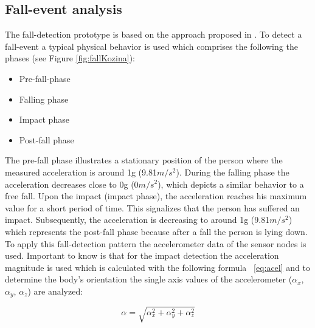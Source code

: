 \documentclass[review]{elsarticle}
\begin{document}
\subsection{Fall-event analysis}
\label{subsec:fall-analysis}
The fall-detection prototype is based on the approach proposed in \cite{Gjoreski2014, Kozina}. To detect a fall-event a typical physical behavior is used which comprises the following the phases (see Figure \ref{fig:fallKozina}):
\begin{itemize}
	\item Pre-fall-phase 
	\item Falling phase
	\item Impact phase
	\item Post-fall phase
\end{itemize}
The pre-fall phase illustrates a stationary position of the person where the measured acceleration is around 1g (9.81$m/s^{2}$). During the falling phase the  acceleration decreases close to 0g (0$m/s^{2}$), which depicts a similar behavior to a free fall. Upon the impact (impact phase), the acceleration reaches his maximum value for a short period of time. This signalizes that the person has suffered an impact. Subsequently, the acceleration is decreasing to around 1g (9.81$m/s^{2}$) which represents the post-fall phase because after a fall the person is lying down. To apply this fall-detection pattern the accelerometer data of the sensor nodes is used. Important to know is that for the impact detection the acceleration magnitude is used which is calculated with the following formula ~\ref{eq:acel} and to determine the body's orientation the single axis values of the accelerometer ($\alpha_x$, $\alpha_y$, $\alpha_z$) are analyzed:

\begin{equation}\label{eq:acel}
\alpha = \sqrt{\alpha_{x}^{2} + \alpha_{y}^{2} + \alpha_{z}^{2}}
\end{equation}
\end{document}
